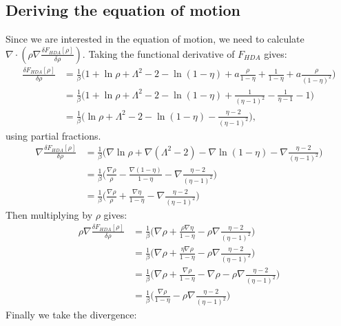 \documentclass[11pt, a4paper]{article}
\theoremstyle{definition}
\begin{document}
\subsection{Deriving the equation of motion}
Since we are interested in the equation of motion, we need to calculate $ \nabla \cdot \left(\rho \nabla \frac{\delta F_{HDA}[\rho]}{\delta \rho} \right)$. 
Taking the functional derivative of $F_{HDA}$ gives:
\begin{align*}
	\frac{\delta F_{HDA}[\rho]}{\delta \rho} &= \frac{1}{\beta} \bigg(1 + \ln \rho + \Lambda^2 -2 - \ln(1-\eta) + a \frac{\rho}{1 - \eta} + \frac{1}{1 - \eta} + a \frac{\rho}{(1 - \eta)^2}  \bigg)\\
	&= \frac{1}{\beta} \bigg(1 + \ln \rho + \Lambda^2 -2 - \ln(1-\eta) + \frac{1}{(\eta - 1)^2} - \frac{1}{\eta - 1}  - 1\bigg)\\
	&= \frac{1}{\beta} \bigg( \ln \rho + \Lambda^2 - 2 - \ln(1-\eta) - \frac{\eta - 2}{(\eta - 1)^2}  \bigg),
\end{align*}
using partial fractions.
\begin{align*}
	\nabla \frac{\delta F_{HDA}[\rho]}{\delta \rho} &= \frac{1}{\beta} \bigg( \nabla\ln \rho + \nabla(\Lambda^2 - 2) - \nabla\ln(1-\eta) - \nabla\frac{\eta - 2}{(\eta - 1)^2}  \bigg)\\
	& = \frac{1}{\beta} \bigg( \frac{\nabla \rho}{\rho} - \frac{\nabla( 1- \eta)}{1 - \eta} - \nabla\frac{\eta - 2}{(\eta - 1)^2}  \bigg)\\
	& = \frac{1}{\beta} \bigg( \frac{\nabla \rho}{\rho} + \frac{\nabla \eta}{1 - \eta} - \nabla\frac{\eta - 2}{(\eta - 1)^2}  \bigg)
\end{align*}
Then multiplying by $\rho$ gives:
\begin{align*}
	\rho \nabla \frac{\delta F_{HDA}[\rho]}{\delta \rho} &= \frac{1}{\beta} \bigg( \nabla \rho +   \frac{\rho \nabla \eta}{1 - \eta} - \rho \nabla\frac{\eta - 2}{(\eta - 1)^2}  \bigg)\\
	&= \frac{1}{\beta} \bigg( \nabla \rho +   \frac{\eta\nabla \rho}{1 - \eta} - \rho \nabla\frac{\eta - 2}{(\eta - 1)^2}  \bigg)\\
	&= \frac{1}{\beta} \bigg( \nabla \rho + \frac{\nabla \rho}{1 - \eta} - \nabla \rho - \rho \nabla\frac{\eta - 2}{(\eta - 1)^2}  \bigg)\\
	&= \frac{1}{\beta} \bigg(  \frac{\nabla \rho}{1 - \eta}  - \rho \nabla\frac{\eta - 2}{(\eta - 1)^2}  \bigg)
\end{align*}
Finally we take the divergence:
\end{document}
